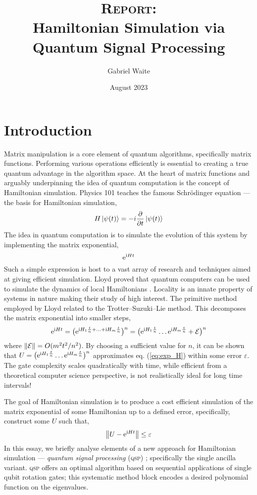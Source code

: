 \documentclass{article}
\title{\textsc{\textbf{Report:}}\\ Hamiltonian Simulation via \\ Quantum Signal Processing}
\author{Gabriel Waite}
\date{August 2023}
\begin{document}
\maketitle

\section{Introduction}
Matrix manipulation is a core element of quantum algorithms, specifically matrix functions. Performing various operations efficiently is essential to creating a true quantum advantage in the algorithm space. At the heart of matrix functions and arguably underpinning the idea of quantum computation \cite{Feynman82} is the concept of Hamiltonian simulation. Physics 101 teaches the famous Schrödinger equation --- the basis for Hamiltonian simulation,
\begin{equation}\label{eq:shcrodinger_eq}
    H\ket{\psi(t)} = -i\pdv{t}\ket{\psi(t)}
\end{equation}
The idea in quantum computation is to simulate the evolution of this system by implementing the matrix exponential,
\begin{equation}\label{eq:exp_H}
    \mathrm{e}^{\mathrm{i} Ht}
\end{equation}
Such a simple expression is host to a vast array of research and techniques aimed at giving efficient simulation. Lloyd proved that quantum computers can be used to simulate the dynamics of local Hamiltonians \cite{Lloyd1996}. Locality is an innate property of systems in nature \cite{Ambainis14QMA,CN14} making their study of high interest. The primitive method employed by Lloyd related to the Trotter--Suzuki--Lie method. This decomposes the matrix exponential into smaller steps,
\begin{equation}
    \mathrm{e}^{\mathrm{i} Ht} = \big(\mathrm{e}^{\mathrm{i} H_1 \frac{t}{n} + \ldots + \mathrm{i} H_m \frac{t}{n}} \big)^n = \big(\mathrm{e}^{\mathrm{i} H_1 \frac{t}{n}}\ldots \mathrm{e}^{\mathrm{i} H_m \frac{t}{n}} + \mathcal{E} \big)^n
\end{equation}
where $\norm{\mathcal{E}} = O(m^2t^2/n^2)$. By choosing a sufficient value for $n$, it can be shown that $U = \big(\mathrm{e}^{\mathrm{i} H_1 \frac{t}{n}}\ldots \mathrm{e}^{\mathrm{i} H_m \frac{t}{n}}\big)^n$ approximates eq. (\ref{eq:exp_H}) within some error $\varepsilon$. The gate complexity scales quadratically with time, while efficient from a theoretical computer science perspective, is not realistically ideal for long time intervals!

The goal of Hamiltonian simulation is to produce a cost efficient simulation of the matrix exponential of some Hamiltonian up to a defined error, specifically, construct some $U$ such that,
\begin{equation}\label{eq:expH_norm}
    \norm{U - \mathrm{e}^{\mathrm{i} Ht}} \leq \varepsilon
\end{equation}
In this essay, we briefly analyse elements of a new approach for Hamiltonian simulation --- \emph{quantum signal processing} (\textsc{qsp}) \cite{LC17}; specifically the single ancilla variant. \textsc{qsp} offers an optimal algorithm based on sequential applications of single qubit rotation gates; this systematic method block encodes a desired polynomial function on the eigenvalues.
\end{document}
